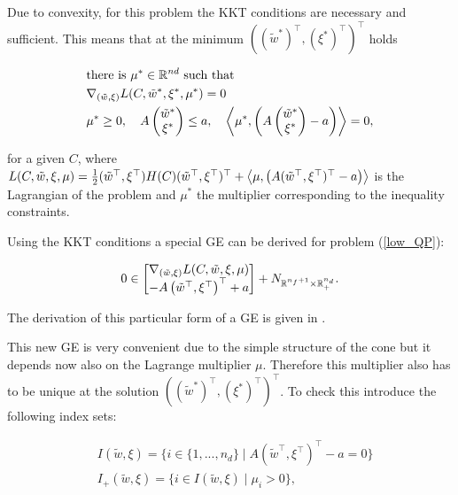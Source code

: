 Due to convexity, for this problem the KKT conditions are necessary and sufficient. This means that at the minimum \(((\tilde{w}^*)^{\top},(\xi^*)^{\top})^{\top}\) holds

\begin{align*}
	& \text{there is } \mu^* \in \mathbb{R}^{nd} \text{ such that} \\
	&\nabla_{(\tilde{w},\xi)} L(C,\tilde{w}^*,\xi^*,\mu^*) = 0 \\
	& \mu^* \geq 0, \quad A \begin{pmatrix}\tilde{w}^*\\\xi^*\end{pmatrix} \leq a, \quad \left\langle\mu^*,\left(A \begin{pmatrix}\tilde{w}^*\\\xi^*\end{pmatrix} - a\right)\right\rangle = 0,
\end{align*}

for a given \(C\), where \(L(C,\tilde{w},\xi,\mu) = \frac{1}{2}(\tilde{w}^{\top},\xi^{\top})H(C)(\tilde{w}^{\top},\xi^{\top})^{\top}+\left\langle\mu,\left(A (\tilde{w}^{\top},\xi^{\top})^{\top} - a\right)\right\rangle\) is the Lagrangian of the problem and \(\mu^*\) the multiplier corresponding to the inequality constraints.

Using the KKT conditions a special GE can be derived for problem (\ref{low_QP}):

\begin{equation}
	0 \in \begin{bmatrix} \nabla_{(\tilde{w},\xi)}L(C,\tilde{w},\xi,\mu)\\ - A \left(\tilde{w}^{\top},\xi^{\top}\right)^{\top} + a\end{bmatrix} + N_{\mathbb{R}^{n_f+1}\times\mathbb{R}^{n_d}_+}.
\label{GE}
\end{equation}

The derivation of this particular form of a GE is given in \cite[chapter 4, p. 71--72 and chapter 5, p. 92]{Outrata1998}.

This new GE is very convenient due to the simple structure of the cone but it depends now also on the Lagrange multiplier \(\mu\). Therefore this multiplier also has to be unique at the solution \(((\tilde{w}^*)^{\top},(\xi^*)^{\top})^{\top}\).
To check this introduce the following index sets:

\begin{align*}
	& I(\tilde{w},\xi) = \{i \in \{1,...,n_d\} \mid A (\tilde{w}^{\top},\xi^{\top})^{\top} - a = 0\} \\
	& I_+(\tilde{w},\xi) = \{i\in I(\tilde{w},\xi) \mid \mu_i > 0\},
\end{align*}

